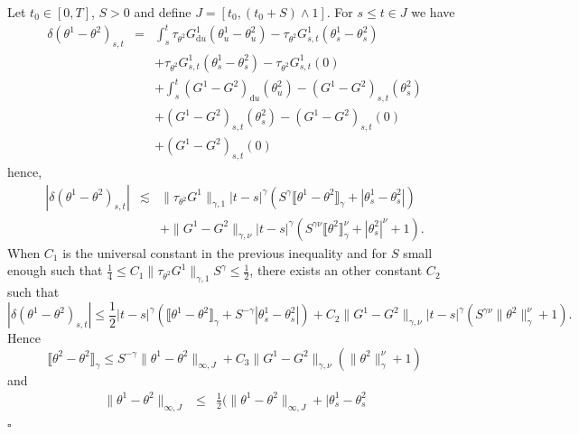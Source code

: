 \documentclass[a4paper,11pt]{article}
\newcommand{\mathd}{\mathrm{d}}
\newenvironment{proof}{{\sc Proof.}}{\hfill$\square$}
\begin{document}
\begin{proof}
  Let $t_{0} \in [ 0,T ]$, $S>0$ and define $J= [ t_{0} , ( t_{0} +S ) \wedge
  1 ]$. For $s \leqslant t \in J$ we have
  \begin{eqnarray*}
    \delta ( \theta^{1} - \theta^{2} )_{s,t} & = & \int_{s}^{t}
    \tau_{\theta^{2}} G^{1}_{\mathd u} ( \theta^{1}_{u} - \theta^{2}_{u} ) -
    \tau_{\theta^{2}} G^{1}_{s,t} ( \theta^{1}_{s} - \theta^{2}_{s} )\\
    &  & + \tau_{\theta^{2}} G^{1}_{s,t} ( \theta^{1}_{s} - \theta^{2}_{s} )
    - \tau_{\theta^{2}} G^{1}_{s,t} ( 0 )\\
    &  & + \int_{s}^{t} ( G^{1} -G^{2} )_{\mathd u} ( \theta^{2}_{u} ) - (
    G^{1} -G^{2} )_{s,t} ( \theta^{2}_{s} )\\
    &  & + ( G^{1} -G^{2} )_{s,t} ( \theta^{2}_{s} ) - ( G^{1} -G^{2} )_{s,t}
    ( 0 )\\
    &  & + ( G^{1} -G^{2} )_{s,t} ( 0 )
  \end{eqnarray*}
  hence,
  \begin{eqnarray*}
    | \delta ( \theta^{1} - \theta^{2} )_{s,t} | & \lesssim & \|
    \tau_{\theta^{2}} G^{1} \|_{\gamma ,1} | t-s |^{\gamma} ( S^{\gamma}
    \llbracket \theta^{1} - \theta^{2} \rrbracket_{\gamma} + | \theta^{1}_{s}
    - \theta^{2}_{s} | )\\
    &  & + \| G^{1} -G^{2} \|_{\gamma , \nu} | t-s |^{\gamma} ( S^{\gamma
    \nu} \llbracket \theta^{2} \rrbracket_{\gamma}^{\nu} + | \theta^{2}_{s}
    |^{\nu} +1 ) .
  \end{eqnarray*}
  When $C_{1}$ is the universal constant in the previous inequality and for
  $S$ small enough such that $\frac{1}{4} \leqslant C_{1} \| \tau_{\theta^{2}}
  G^{1} \|_{\gamma ,1} S^{\gamma} \leqslant \frac{1}{2}$, there exists an
  other constant $C_{2}$ such that
  \[ | \delta ( \theta^{1} - \theta^{2} )_{s,t} | \leqslant \frac{1}{2} | t-s
     |^{\gamma} ( \llbracket \theta^{1} - \theta^{2} \rrbracket_{\gamma} +S^{-
     \gamma} | \theta^{1}_{s} - \theta^{2}_{s} | ) +C_{2} \| G^{1} -G^{2}
     \|_{\gamma , \nu} | t-s |^{\gamma} ( S^{\gamma \nu} \| \theta^{2}
     \|^{\nu}_{\gamma} +1 ) . \]
  Hence
  \[ \llbracket \theta^{2} - \theta^{2} \rrbracket_{\gamma} \leqslant S^{-
     \gamma} \| \theta^{1} - \theta^{2} \|_{\infty ,J} +C_{3} \| G^{1} -G^{2}
     \|_{\gamma , \nu} ( \| \theta^{2} \|^{\nu}_{\gamma} +1 ) \]
  and
  \begin{eqnarray*}
    \| \theta^{1} - \theta^{2} \|_{\infty ,J} & \leqslant & \frac{1}{2} ( \|
    \theta^{1} - \theta^{2} \|_{\infty ,J} + | \theta^{1}_{s} - \theta^{2}_{s}

\end{eqnarray*}
\end{proof}
\end{document}

